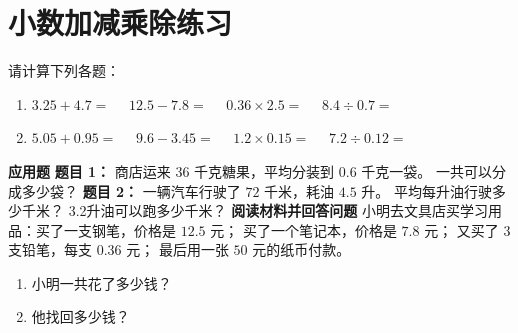 \documentclass[12pt]{article}
\begin{document}
\section*{小数加减乘除练习}

请计算下列各题：

\begin{enumerate}
  \item $3.25 + 4.7 = \quad$
   $12.5 - 7.8 = \quad$
  $0.36 \times 2.5 = \quad$
   $8.4 \div 0.7 = \quad$
  \item $5.05 + 0.95 = \quad$
   $9.6 - 3.45 = \quad$
   $1.2 \times 0.15 = \quad$
   $7.2 \div 0.12 = \quad$
\end{enumerate}
\textbf{应用题}\newline 
\textbf{题目 1：}  
商店运来 $36$ 千克糖果，平均分装到 $0.6$ 千克一袋。\newline  
 一共可以分成多少袋？
\newline
\textbf{题目 2：}  
一辆汽车行驶了 $72$ 千米，耗油 $4.5$ 升。 \newline  
 平均每升油行驶多少千米？\newline
 3.2升油可以跑多少千米？
 \newline
\textbf{阅读材料并回答问题} \newline 
小明去文具店买学习用品：买了一支钢笔，价格是 $12.5$ 元；
   买了一个笔记本，价格是 $7.8$ 元；
   又买了 $3$ 支铅笔，每支 $0.36$ 元；
   最后用一张 $50$ 元的纸币付款。
\begin{enumerate}
  \item 小明一共花了多少钱？ 
  \item 他找回多少钱？ 
\end{enumerate}
\end{document}
